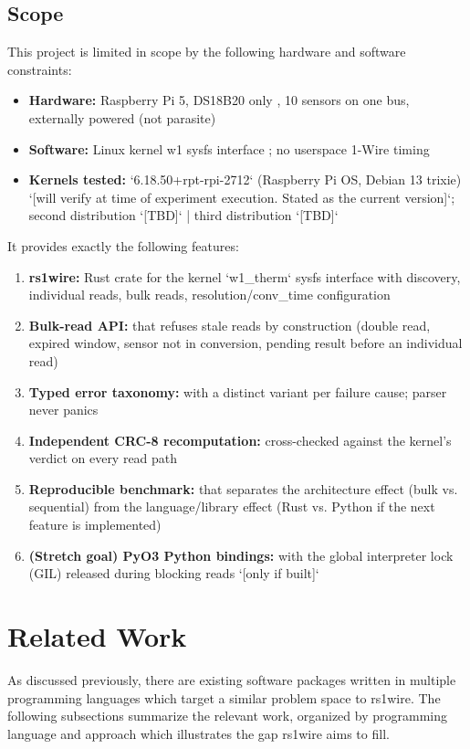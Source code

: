 \documentclass[conference]{IEEEtran}
\begin{document}
\subsection{Scope}

This project is limited in scope by the following hardware and software constraints:
\begin{itemize}
\item \textbf{Hardware:} Raspberry Pi 5, DS18B20 only \cite{ds18b20_datasheet}, 10 sensors on one bus, externally powered (not parasite)
\item \textbf{Software:} Linux kernel w1 sysfs interface \cite{kernel_w1_therm_docs}; no userspace 1-Wire timing
\item \textbf{Kernels tested:} `6.18.50+rpt-rpi-2712` (Raspberry Pi OS, Debian 13 trixie) `[will verify at time of experiment execution. Stated as the current version]`; second distribution `[TBD]` | third distribution `[TBD]`
\end{itemize}
It provides exactly the following features:
\begin{enumerate}
\item \textbf{rs1wire:} Rust crate for the kernel `w1\_therm` sysfs interface with discovery, individual reads, bulk reads, resolution/conv\_time configuration
\item \textbf{Bulk-read API:} that refuses stale reads by construction (double read, expired window, sensor not in conversion, pending result before an individual read)
\item \textbf{Typed error taxonomy:} with a distinct variant per failure cause; parser never panics
\item \textbf{Independent CRC-8 recomputation:} cross-checked against the kernel's verdict on every read path
\item \textbf{Reproducible benchmark:} that separates the architecture effect (bulk vs. sequential) from the language/library effect (Rust vs. Python if the next feature is implemented)
\item \textbf{(Stretch goal) PyO3 Python bindings:} with the global interpreter lock (GIL) released during blocking reads `[only if built]`
\end{enumerate}

\section{Related Work}
As discussed previously, there are existing software packages written in multiple programming languages which target a similar problem space to rs1wire.
The following subsections summarize the relevant work, organized by programming language and approach which illustrates the gap rs1wire aims to fill.
\end{document}
